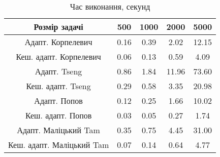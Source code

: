 \begin{table}[H]
	\centering
	\begin{tabular}{|c||c|c|c|c|}\hline
		Розмір задачі & 500 & 1000 & 2000 & 5000 \\ \hline \hline
		Адапт. Корпелевич & 0.16 & 0.39 & 2.02 & 12.15 \\ \hline
		Кеш. адапт. Корпелевич & 0.06 & 0.13 & 0.59 & 4.09 \\ \hline
		Адапт. Tseng & 0.86 & 1.84 & 11.96 & 73.60 \\ \hline
		Кеш. адапт. Tseng & 0.29 & 0.58 & 3.35 & 20.98 \\ \hline
		Адапт. Попов & 0.12 & 0.25 & 1.66 & 10.02 \\ \hline
		Кеш. адапт. Попов & 0.03 & 0.05 & 0.27 & 1.74 \\ \hline
		Адапт. Маліцький Tam & 0.35 & 0.75 & 4.45 & 31.00 \\ \hline
		Кеш. адапт. Маліцький Tam & 0.07 & 0.14 & 0.64 & 4.77 \\ \hline
	\end{tabular}
	\caption{Час виконання, секунд}
\end{table}
